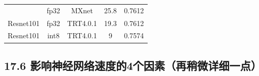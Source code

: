 \begin{longtable}[]{ ccccc }
\begin{minipage}[t]{0.09\columnwidth}
\end{minipage} & \begin{minipage}[t]{0.09\columnwidth}\centering\strut
fp32\strut
\end{minipage} & \begin{minipage}[t]{0.20\columnwidth}\centering\strut
MXnet\strut
\end{minipage} & \begin{minipage}[t]{0.24\columnwidth}\centering\strut
25.8\strut
\end{minipage} & \begin{minipage}[t]{0.24\columnwidth}\centering\strut
0.7612\strut
\end{minipage}\tabularnewline
\begin{minipage}[t]{0.09\columnwidth}\centering\strut
Resnet101\strut
\end{minipage} & \begin{minipage}[t]{0.09\columnwidth}\centering\strut
fp32\strut
\end{minipage} & \begin{minipage}[t]{0.20\columnwidth}\centering\strut
TRT4.0.1\strut
\end{minipage} & \begin{minipage}[t]{0.24\columnwidth}\centering\strut
19.3\strut
\end{minipage} & \begin{minipage}[t]{0.24\columnwidth}\centering\strut
0.7612\strut
\end{minipage}\tabularnewline
\begin{minipage}[t]{0.09\columnwidth}\centering\strut
Resnet101\strut
\end{minipage} & \begin{minipage}[t]{0.09\columnwidth}\centering\strut
int8\strut
\end{minipage} & \begin{minipage}[t]{0.20\columnwidth}\centering\strut
TRT4.0.1\strut
\end{minipage} & \begin{minipage}[t]{0.24\columnwidth}\centering\strut
9\strut
\end{minipage} & \begin{minipage}[t]{0.24\columnwidth}\centering\strut
0.7574\strut
\end{minipage}\tabularnewline
\bottomrule
\end{longtable}

\subsection{17.6
影响神经网络速度的4个因素（再稍微详细一点）}\label{ux5f71ux54cdux795eux7ecfux7f51ux7edcux901fux5ea6ux76844ux4e2aux56e0ux7d20ux518dux7a0dux5faeux8be6ux7ec6ux4e00ux70b9}

